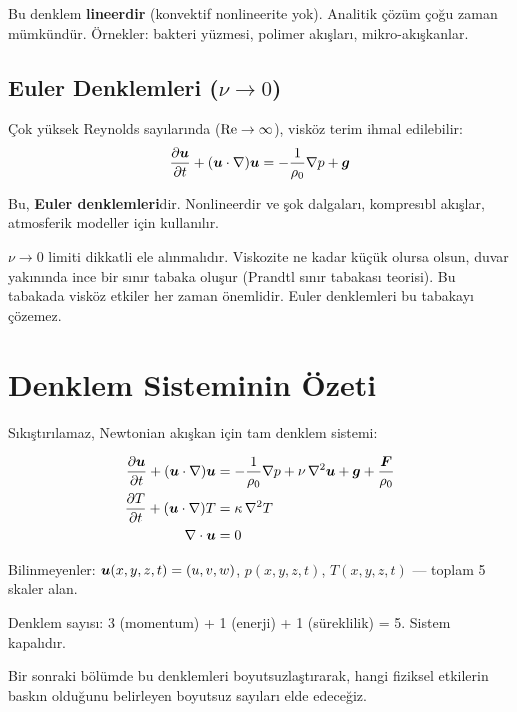 Bu denklem \textbf{lineerdir} (konvektif nonlineerite yok). Analitik çözüm çoğu zaman mümkündür. Örnekler: bakteri yüzmesi, polimer akışları, mikro-akışkanlar.

\subsection{Euler Denklemleri ($\nu \to 0$)}

Çok yüksek Reynolds sayılarında ($\mathrm{Re} \to \infty$), visköz terim ihmal edilebilir:
\begin{equation}
    \frac{\partial \bm{u}}{\partial t} + (\bm{u}\cdot\nabla)\bm{u} = -\frac{1}{\rho_0}\nabla p + \bm{g}
    \label{eq:euler}
\end{equation}

Bu, \textbf{Euler denklemleri}dir. Nonlineerdir ve şok dalgaları, kompresıbl akışlar, atmosferik modeller için kullanılır.

\begin{remark}
$\nu \to 0$ limiti dikkatli ele alınmalıdır. Viskozite ne kadar küçük olursa olsun, duvar yakınında ince bir sınır tabaka oluşur (Prandtl sınır tabakası teorisi). Bu tabakada visköz etkiler her zaman önemlidir. Euler denklemleri bu tabakayı çözemez.
\end{remark}


\section{Denklem Sisteminin Özeti}
\label{sec:denklem_ozet}

Sıkıştırılamaz, Newtonian akışkan için tam denklem sistemi:

\begin{subequations}
\label{eq:full_system}
\begin{align}
    \frac{\partial \bm{u}}{\partial t} + (\bm{u}\cdot\nabla)\bm{u} &= -\frac{1}{\rho_0}\nabla p + \nu\,\nabla^2\bm{u} + \bm{g} + \frac{\bm{F}}{\rho_0} \label{eq:full_momentum} \\
    \frac{\partial T}{\partial t} + (\bm{u}\cdot\nabla)T &= \kappa\,\nabla^2 T \label{eq:full_energy} \\
    \nabla \cdot\bm{u} &= 0 \label{eq:full_continuity}
\end{align}
\end{subequations}

Bilinmeyenler: $\bm{u}(x,y,z,t) = (u,v,w)$, $p(x,y,z,t)$, $T(x,y,z,t)$ --- toplam 5 skaler alan.

Denklem sayısı: 3 (momentum) + 1 (enerji) + 1 (süreklilik) = 5. Sistem kapalıdır.

Bir sonraki bölümde bu denklemleri boyutsuzlaştırarak, hangi fiziksel etkilerin baskın olduğunu belirleyen boyutsuz sayıları elde edeceğiz.
